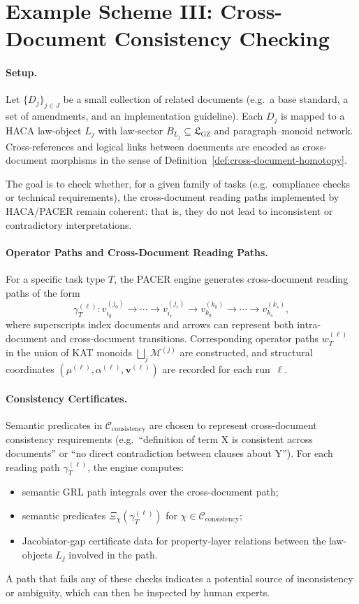 \documentclass[11pt]{book}
\theoremstyle{plain}
\theoremstyle{definition}
\theoremstyle{remark}
\newcommand{\GZLS}{\ensuremath{\mathfrak{L}_{\mathrm{GZ}}}}       \newcommand{\GZLT}{\ensuremath{M_{!w}}}                           \newcommand{\GZLOC}{\ensuremath{A_M}}                             \newcommand{\GZLC}{\ensuremath{\omega_{\mathrm{law}}}}            \newcommand{\GZLCurv}{\ensuremath{\mathcal{F}_{\mathrm{law}}}}
\begin{document}
\section{Example Scheme III: Cross-Document Consistency Checking}


\paragraph{Setup.}
Let $\{D_j\}_{j\in J}$ be a small collection of related documents
(e.g.\ a base standard, a set of amendments, and an implementation
guideline). Each $D_j$ is mapped to a HACA law-object $L_j$ with
law-sector $B_{L_j}\subseteq\GZLS$ and paragraph–monoid network.
Cross-references and logical links between documents are encoded as
cross-document morphisms in the sense of
Definition~\ref{def:cross-document-homotopy}.

The goal is to check whether, for a given family of tasks (e.g.\
compliance checks or technical requirements), the cross-document
reading paths implemented by HACA/PACER remain coherent: that is, they
do not lead to inconsistent or contradictory interpretations.

\paragraph{Operator Paths and Cross-Document Reading Paths.}
For a specific task type $T$, the PACER engine generates cross-document
reading paths of the form
\[
  \gamma_T^{(\ell)}:
  v_{i_0}^{(j_0)}\to\cdots\to v_{i_r}^{(j_r)}\to
  v_{k_0}^{(k_0)}\to\cdots\to v_{k_s}^{(k_s)},
\]
where superscripts index documents and arrows can represent both
intra-document and cross-document transitions. Corresponding operator
paths $w_T^{(\ell)}$ in the union of KAT monoids
$\bigsqcup_j\mathcal{M}^{(j)}$ are constructed, and structural
coordinates $(\mu^{(\ell)},\alpha^{(\ell)},\mathbf{v}^{(\ell)})$ are
recorded for each run~$\ell$.

\paragraph{Consistency Certificates.}
Semantic predicates in $\mathcal{C}_{\mathrm{consistency}}$ are
chosen to represent cross-document consistency requirements (e.g.\
``definition of term X is consistent across documents'' or ``no direct
contradiction between clauses about Y''). For each reading path
$\gamma_T^{(\ell)}$, the engine computes:
\begin{itemize}
  \item semantic GRL path integrals over the cross-document path;
  \item semantic predicates $\Xi_\chi(\gamma_T^{(\ell)})$ for
        $\chi\in\mathcal{C}_{\mathrm{consistency}}$;
  \item Jacobiator-gap certificate data for property-layer relations
        between the law-objects $L_j$ involved in the path.
\end{itemize}
A path that fails any of these checks indicates a potential source of
inconsistency or ambiguity, which can then be inspected by human
experts.
\end{document}
